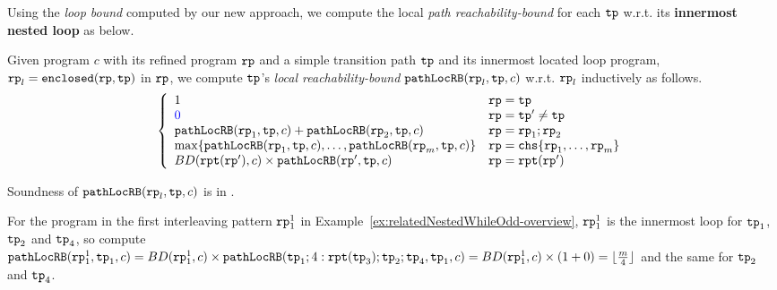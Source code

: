 Using the \emph{loop bound} computed by our new approach, we compute the local \emph{path reachability-bound} for
each $\mathtt{tp}$ w.r.t. its \textbf{innermost nested loop} as below.

\begin{defn}
    \label{def:pathlocalrb}
    Given program $c$ with its refined program $\mathtt{rp}$ and a simple transition path $\mathtt{tp}$ and its innermost located loop program, $\mathtt{rp}_l = \mathtt{enclosed}(\mathtt{rp}, \mathtt{tp})$ in $\mathtt{rp}$,
    we compute $\mathtt{tp}$'s \emph{local reachability-bound} $\mathtt{pathLocRB}(\mathtt{rp}_l, \mathtt{tp}, c)$ w.r.t. $\mathtt{rp}_l$ inductively as follows.
    {\small
    \[
      \left\{
    \begin{array}{ll}
       1  & \rprog = \tpath\\
      \highlight{0} & \rprog = \tpath' \neq \tpath\\
      \outinB(\rprog_1, \tpath, c) + \outinB(\rprog_2, \tpath, c) & \rprog = \rprog_1;\rprog_2 \\
      \max\left\{ \outinB(\rprog_1, \tpath, c), \ldots, \outinB(\rprog_m, \tpath, c) \right\} 
      & \rprog = \rpchoose{\rprog_1, \ldots, \rprog_m } \\
      BD(\rprepeat(\rprog'), c) \times \outinB(\rprog', \tpath, c) & \rprog = \rprepeat(\rprog')
    \end{array}
    \right.
    \]
    }
  \end{defn}
  Soundness of $\mathtt{pathLocRB}(\mathtt{rp}_l, \mathtt{tp}, c)$ is in .

  For the program in the first interleaving pattern $\mathtt{rp}_1^1$ in Example~\ref{ex:relatedNestedWhileOdd-overview}, $\mathtt{rp}_1^1$ is the innermost loop for $\mathtt{tp}_1$, $\mathtt{tp}_2$ and $\mathtt{tp}_4$, 
  so compute $\mathtt{pathLocRB}(\mathtt{rp}_1^1, \mathtt{tp}_1, c) = BD(\mathtt{rp}_1^1, c) \times \mathtt{pathLocRB}(\mathtt{tp}_1; 4:\mathtt{rpt}(\mathtt{tp}_3); \mathtt{tp}_2; \mathtt{tp}_4, \mathtt{tp}_1, c)
  = BD(\mathtt{rp}_1^1, c) \times (1 + 0) = \lfloor \frac{m}{4} \rfloor $ and the same for $\mathtt{tp}_2$ and $\mathtt{tp}_4$.

